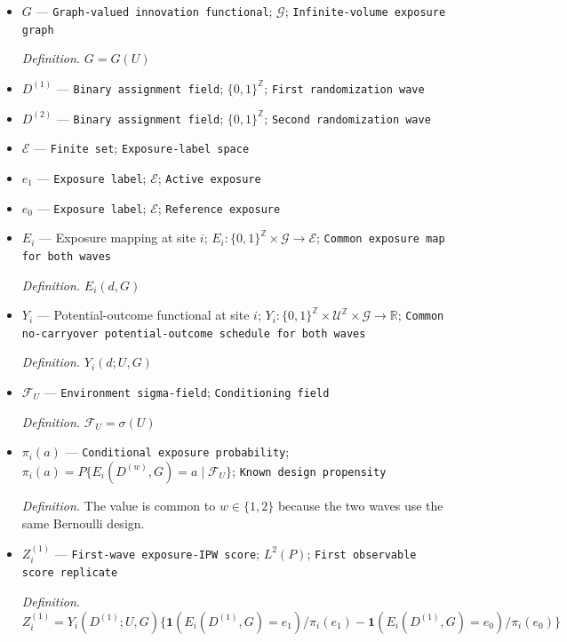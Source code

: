\documentclass{article}
\begin{document}
\begin{itemize}
  \item \(G\) --- \texttt{Graph-\allowbreak{}valued innovation functional}; \(\mathcal G\); \texttt{Infinite-\allowbreak{}volume exposure graph}
  \par\smallskip\noindent\emph{Definition.} \(G=G(U)\)
  \item \(D^{(1)}\) --- \texttt{Binary assignment field}; \(\{0,1\}^{\mathbb Z}\); \texttt{First randomization wave}
  \item \(D^{(2)}\) --- \texttt{Binary assignment field}; \(\{0,1\}^{\mathbb Z}\); \texttt{Second randomization wave}
  \item \(\mathcal E\) --- \texttt{Finite set}; \texttt{Exposure-\allowbreak{}label space}
  \item \(e_1\) --- \texttt{Exposure label}; \(\mathcal E\); \texttt{Active exposure}
  \item \(e_0\) --- \texttt{Exposure label}; \(\mathcal E\); \texttt{Reference exposure}
  \item \(E_i\) --- Exposure mapping at site \(i\); \(E_i:\{0,1\}^{\mathbb Z}\times\mathcal G\to\mathcal E\); \texttt{Common exposure map for both waves}
  \par\smallskip\noindent\emph{Definition.} \(E_i(d,G)\)
  \item \(Y_i\) --- Potential-outcome functional at site \(i\); \(Y_i:\{0,1\}^{\mathbb Z}\times\mathcal U^{\mathbb Z}\times\mathcal G\to\mathbb R\); \texttt{Common no-\allowbreak{}carryover potential-\allowbreak{}outcome schedule for both waves}
  \par\smallskip\noindent\emph{Definition.} \(Y_i(d;U,G)\)
  \item \(\mathcal F_U\) --- \texttt{Environment sigma-\allowbreak{}field}; \texttt{Conditioning field}
  \par\smallskip\noindent\emph{Definition.} \(\mathcal F_U=\sigma(U)\)
  \item \(\pi_i(a)\) --- \texttt{Conditional exposure probability}; \(\pi_i(a)=P\{E_i(D^{(w)},G)=a\mid\mathcal F_U\}\); \texttt{Known design propensity}
  \par\smallskip\noindent\emph{Definition.} The value is common to \(w\in\{1,2\}\) because the two waves use the same Bernoulli design.
  \item \(Z_i^{(1)}\) --- \texttt{First-\allowbreak{}wave exposure-\allowbreak{}IPW score}; \(L^2(P)\); \texttt{First observable score replicate}
  \par\smallskip\noindent\emph{Definition.} \(Z_i^{(1)}=Y_i(D^{(1)};U,G)\{\mathbf 1(E_i(D^{(1)},G)=e_1)/\pi_i(e_1)-\mathbf 1(E_i(D^{(1)},G)=e_0)/\pi_i(e_0)\}\)

\end{itemize}
\end{document}
